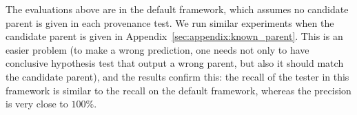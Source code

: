 

The evaluations above are in the default framework, which assumes no candidate parent is given in each provenance test. 
We run similar experiments when the candidate parent is given  in Appendix~\ref{sec:appendix:known_parent}. This is an easier problem (to make a wrong prediction, one needs not only to have conclusive hypothesis test that output a wrong parent, but also it should match the candidate parent), and the results confirm this: the recall of the tester in this framework is similar to the recall on the default framework, whereas the precision is very close to $100\%$. 


